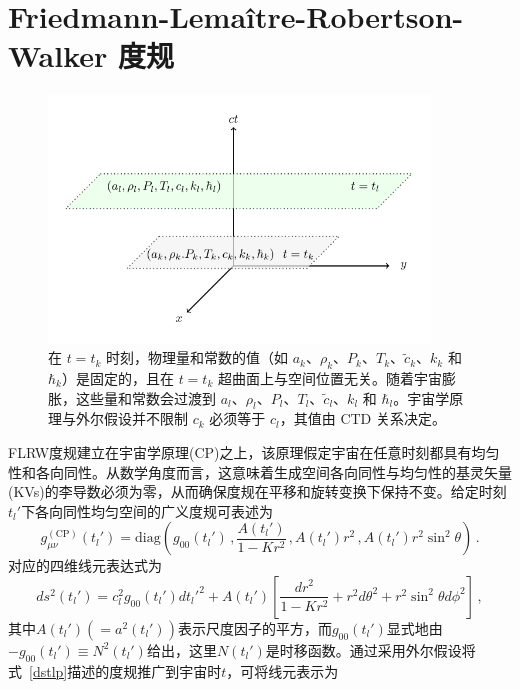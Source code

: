 \documentclass[jkps,preprint,fleqn]{revtex4}
\newcommand{\tc}{\tilde{c}}
\begin{document}
\section{Friedmann-Lemaître-Robertson-Walker 度规}
\label{sec:RWm}
\begin{figure}
	\begin{center}
	\includegraphics[width=0.9\textwidth]{Fig1.pdf}
	\caption{在 $t = t_k$ 时刻，物理量和常数的值（如 $a_k$、$\rho_k$、$P_k$、$T_k$、$\tc_k$、$k_{k}$ 和 $\hbar_k$）是固定的，且在 $t=t_k$ 超曲面上与空间位置无关。随着宇宙膨胀，这些量和常数会过渡到 $a_l$、$\rho_l$、$P_l$、$T_l$、$\tc_l$、$k_l$ 和 $\hbar_l$。宇宙学原理与外尔假设并不限制 $c_k$ 必须等于 $c_l$，其值由 CTD 关系决定。}
	\label{Fig1}
	\end{center}
\end{figure}
FLRW度规建立在宇宙学原理(CP)之上，该原理假定宇宙在任意时刻都具有均匀性和各向同性。从数学角度而言，这意味着生成空间各向同性与均匀性的基灵矢量(KVs)的李导数必须为零，从而确保度规在平移和旋转变换下保持不变\cite{Lee:2024mal,Ryder09}。给定时刻$t_l'$下各向同性均匀空间的广义度规可表述为
\begin{equation}
g_{\mu\nu}^{(\text{CP})}(t_l') = \text{diag} \left( g_{00}(t_l') \,,  \frac{A(t_l')}{1-Kr^2} \,,  A(t_l') r^2 \,,  A(t_l') r^2 \sin^2 \theta \right) \,.
\end{equation}
对应的四维线元表达式为
\begin{equation}
ds^2(t_l') = c_l^2 g_{00}(t_l') dt_l'^2 + A(t_l') \left[ \frac{dr^2}{1-Kr^2} + r^2 d \theta^2 + r^2 \sin^2 \theta d \phi^2 \right] \label{dstlp} \,,
\end{equation}
其中$A(t_l') (= a^2(t_l'))$表示尺度因子的平方，而$g_{00}(t_l')$显式地由$-g_{00}(t_l') \equiv N^2(t_l')$给出，这里$N(t_l')$是时移函数\cite{Lee:2024zcu,Ryder09}。通过采用外尔假设将式~\eqref{dstlp}描述的度规推广到宇宙时$t$，可将线元表示为
\end{document}
